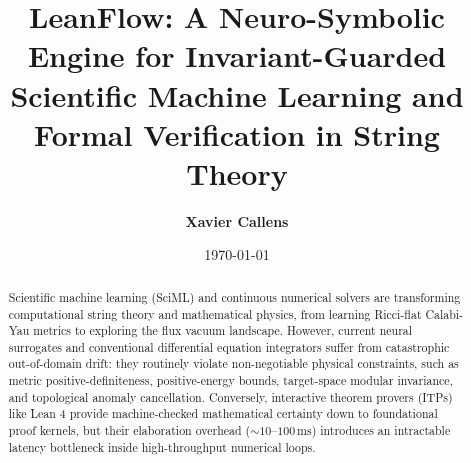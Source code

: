 \documentclass[11pt,a4paper]{article}
\title{\textbf{LeanFlow: A Neuro-Symbolic Engine for Invariant-Guarded Scientific Machine Learning and Formal Verification in String Theory}}
\author[1]{\textbf{Xavier Callens}}
\affil[1]{SocrateAI Research, Independent Researcher \protect\\ \texttt{contact@socrateai.com}}
\date{\today}
\begin{document}
\maketitle

\begin{abstract}
Scientific machine learning (SciML) and continuous numerical solvers are transforming computational string theory and mathematical physics, from learning Ricci-flat Calabi-Yau metrics to exploring the flux vacuum landscape. However, current neural surrogates and conventional differential equation integrators suffer from catastrophic out-of-domain drift: they routinely violate non-negotiable physical constraints, such as metric positive-definiteness, positive-energy bounds, target-space modular invariance, and topological anomaly cancellation. Conversely, interactive theorem provers (ITPs) like Lean 4 provide machine-checked mathematical certainty down to foundational proof kernels, but their elaboration overhead ($\sim 10\text{--}100\,\text{ms}$) introduces an intractable latency bottleneck inside high-throughput numerical loops.


\end{abstract}
\end{document}
